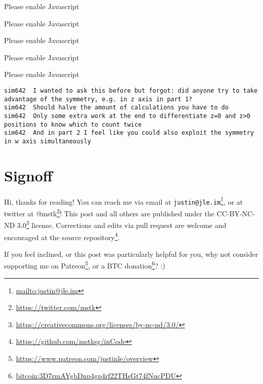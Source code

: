 \documentclass[]{article}
\renewcommand{\href}[2]{#2\footnote{\url{#1}}}
\begin{document}
\leavevmode\hypertarget{gol3D}{}%
Please enable Javascript

\leavevmode\hypertarget{gol4D}{}%
Please enable Javascript

\leavevmode\hypertarget{golFlat}{}%
Please enable Javascript

\leavevmode\hypertarget{golSymsForward}{}%
Please enable Javascript

\leavevmode\hypertarget{golSymsReverse}{}%
Please enable Javascript

\begin{verbatim}
sim642  I wanted to ask this before but forgot: did anyone try to take advantage of the symmetry, e.g. in z axis in part 1?
sim642  Should halve the amount of calculations you have to do
sim642  Only some extra work at the end to differentiate z=0 and z>0 positions to know which to count twice
sim642  And in part 2 I feel like you could also exploit the symmetry in w axis simultaneously
\end{verbatim}

\hypertarget{signoff}{%
\section{Signoff}\label{signoff}}

Hi, thanks for reading! You can reach me via email at
\href{mailto:justin@jle.im}{\nolinkurl{justin@jle.im}}, or at twitter at
\href{https://twitter.com/mstk}{@mstk}! This post and all others are published
under the \href{https://creativecommons.org/licenses/by-nc-nd/3.0/}{CC-BY-NC-ND
3.0} license. Corrections and edits via pull request are welcome and encouraged
at \href{https://github.com/mstksg/inCode}{the source repository}.

If you feel inclined, or this post was particularly helpful for you, why not
consider \href{https://www.patreon.com/justinle/overview}{supporting me on
Patreon}, or a \href{bitcoin:3D7rmAYgbDnp4gp4rf22THsGt74fNucPDU}{BTC donation}?
:)
\end{document}
